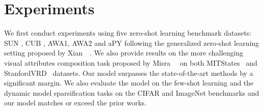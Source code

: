 \documentclass[10pt,twocolumn,letterpaper]{article}
\newcommand{\model}{TAFE-Net\xspace}
\begin{document}
\newcommand{\controlmodel}{controller\xspace}\newcommand{\controlmodelplural}{controllers\xspace}\section{Experiments}\label{sec:exp}%
We first conduct experiments using five zero-shot learning benchmark datasets: SUN%
, CUB%
, AWA1, %
AWA2 %
and aPY %
following the generalized zero-shot learning setting proposed by Xian~\etal~\cite{xian2018zero}. We also provide results on the more 
challenging visual attributes composition task proposed by Misra~\etal~\cite{misra2017red} on both
MITStates~\cite{StatesAndTransformations} and StanfordVRD~\cite{lu2016visual} datasets. Our model surpasses the 
state-of-the-art methods by a significant margin. We also evaluate the model on the few-shot learning and the 
dynamic model sparsification tasks on the CIFAR and ImageNet 
benchmarks and our model matches or exceed the prior works. 
\end{document}
